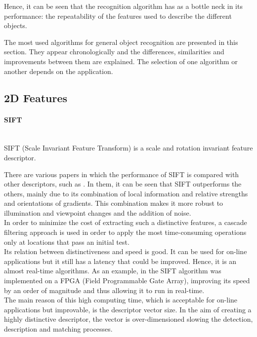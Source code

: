 Hence, it can be seen that the recognition algorithm has as a bottle neck in its performance: the repeatability of the features used to describe the different objects. 

The most used algorithms for general object recognition are presented in this section. 
They appear chronologically and the differences, similarities and improvements between them are explained. 
The selection of one algorithm or another depends on the application.
\\

\subsection{2D Features}
\label{2d_features}

\paragraph{SIFT}\mbox{}\\

SIFT (Scale Invariant Feature Transform) is a scale and rotation invariant feature descriptor\cite{sift}. 

There are various papers in which the performance of SIFT is compared with other descriptors, such as \cite{Mikolajczyk2005}. In them, it can be seen that SIFT outperforms the others, mainly due to its combination of local information and relative strengths and orientations of gradients. This combination makes it more robust to illumination and viewpoint changes and the addition of noise. 
\\

In order to minimize the cost of extracting such a distinctive features, a cascade filtering approach is used in order to apply the most time-consuming operations only at locations that pass an initial test. 
\\

Its relation between distinctiveness and speed is good. It can be used for on-line applications but it still has a latency that could be improved. Hence, it is an almost real-time algorithms. As an example, in \cite{sift_fpga} the SIFT algorithm was implemented on a FPGA (Field Programmable Gate Array), improving its speed by an order of magnitude and thus allowing it to run in real-time.
\\

The main reason of this high computing time, which is acceptable for on-line applications but improvable, is the descriptor vector size. In the aim of creating a highly distinctive descriptor, the vector is over-dimensioned slowing the detection, description and matching processes. 
\\

